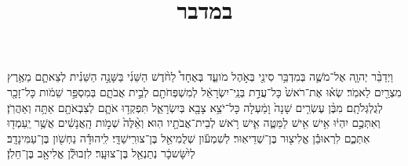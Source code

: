 \documentclass{openreader}
\title{במדבר}
\date{}
\begin{document}
\maketitle
\raggedbottom 
\fontsize{16pt}{24pt}\selectfont


וַיְדַבֵּ֨ר יְהוָ֧ה אֶל־מֹשֶׁ֛ה בְּמִדְבַּ֥ר סִינַ֖י בְּאֹ֣הֶל מֹועֵ֑ד בְּאֶחָד֩ לַחֹ֨דֶשׁ הַשֵּׁנִ֜י בַּשָּׁנָ֣ה הַשֵּׁנִ֗ית לְצֵאתָ֛ם מֵאֶ֥רֶץ מִצְרַ֖יִם לֵאמֹֽר׃ 
שְׂא֗וּ אֶת־רֹאשׁ֙ כָּל־עֲדַ֣ת בְּנֵֽי־יִשְׂרָאֵ֔ל לְמִשְׁפְּחֹתָ֖ם לְבֵ֣ית אֲבֹתָ֑ם בְּמִסְפַּ֣ר שֵׁמֹ֔ות כָּל־זָכָ֖ר לְגֻלְגְּלֹתָֽם׃ 
מִבֶּ֨ן עֶשְׂרִ֤ים שָׁנָה֙ וָמַ֔עְלָה כָּל־יֹצֵ֥א צָבָ֖א בְּיִשְׂרָאֵ֑ל תִּפְקְד֥וּ אֹתָ֛ם לְצִבְאֹתָ֖ם אַתָּ֥ה וְאַהֲרֹֽן׃ 
וְאִתְּכֶ֣ם יִהְי֔וּ אִ֥ישׁ אִ֖ישׁ לַמַּטֶּ֑ה אִ֛ישׁ רֹ֥אשׁ לְבֵית־אֲבֹתָ֖יו הֽוּא׃ 
וְאֵ֨לֶּה֙ שְׁמֹ֣ות הָֽאֲנָשִׁ֔ים אֲשֶׁ֥ר יַֽעַמְד֖וּ אִתְּכֶ֑ם לִרְאוּבֵ֕ן אֱלִיצ֖וּר בֶּן־שְׁדֵיאֽוּר׃ 
לְשִׁמְעֹ֕ון שְׁלֻמִיאֵ֖ל בֶּן־צוּרִֽישַׁדָּֽי׃ 
לִֽיהוּדָ֕ה נַחְשֹׁ֖ון בֶּן־עַמִּינָדָֽב׃ 
לְיִ֨שָּׂשכָ֔ר נְתַנְאֵ֖ל בֶּן־צוּעָֽר׃ 
לִזְבוּלֻ֕ן אֱלִיאָ֖ב בֶּן־חֵלֹֽן׃ 
\end{document}
